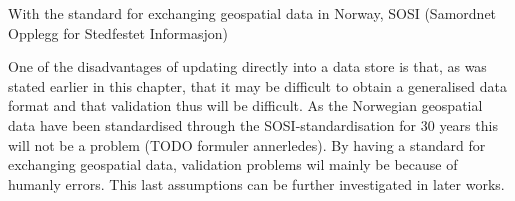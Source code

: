 With the standard for exchanging geospatial data in Norway, SOSI (Samordnet Opplegg for Stedfestet Informasjon) 


One of the disadvantages of updating directly into a data store is that, as was stated earlier in this chapter, that it may be difficult to obtain a generalised data format and that validation thus will be difficult. As the Norwegian geospatial data have been standardised through the SOSI-standardisation for 30 years this will not be a problem (TODO formuler annerledes). By having a standard for exchanging geospatial data, validation problems wil mainly be because of humanly errors. This last assumptions can be further investigated in later works. 














